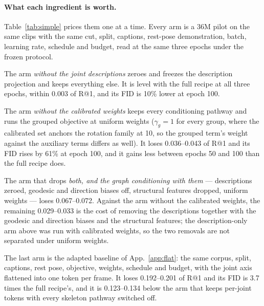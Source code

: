 \paragraph{What each ingredient is worth.} Table~\ref{tab:simple} prices them one at a time. Every arm is a
\num{36}M pilot on the same clips with the same cut, split, captions, rest-pose demonstration, batch, learning
rate, schedule and budget, read at the same three epochs under the frozen protocol.

The arm \emph{without the joint descriptions} zeroes and freezes the description projection and keeps
everything else. It is level with the full recipe at all three epochs, within \num{0.003} of R@1,
and its FID is \num{10}\% lower at epoch 100.

The arm \emph{without the calibrated weights} keeps every conditioning pathway and runs the grouped objective
at uniform weights ($\gamma_g{=}1$ for every group, where the calibrated set anchors the rotation family at 10, so
the grouped term's weight against the auxiliary terms differs as well). It loses \num{0.036}--\num{0.043} of R@1 and its FID rises by \num{61}\% at epoch 100, and
it gains less between epochs 50 and 100 than the full recipe does.

The arm that drops \emph{both, and the graph conditioning with them} --- descriptions zeroed, geodesic and
direction biases off, structural features dropped, uniform weights --- loses \num{0.067}--\num{0.072}. Against
the arm without the calibrated weights, the remaining \num{0.029}--\num{0.033} is the cost of removing the
descriptions together with the geodesic and direction biases and the structural features; the description-only
arm above was run with calibrated weights, so the two removals are not separated under uniform weights.

The last arm is the adapted baseline of App.~\ref{app:flat}: the same corpus, split, captions, rest pose,
objective, weights, schedule and budget, with the joint axis flattened into one token per frame. It loses
\num{0.192}--\num{0.201} of R@1 and its FID is \num{3.7} times the full recipe's, and it is
\num{0.123}--\num{0.134} below the arm that keeps per-joint tokens with every skeleton pathway switched off.


